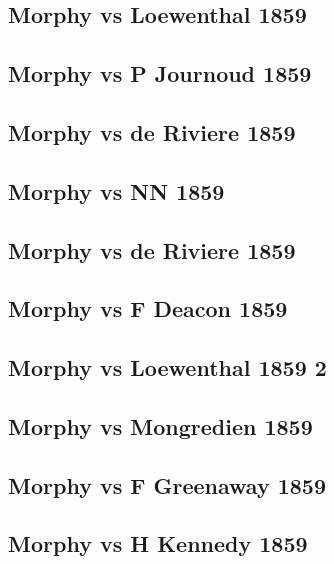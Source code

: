 \documentclass[]{book}
\begin{document}
\subsection{Morphy vs Loewenthal 1859}\label{morphy-vs-loewenthal-1859}

\subsection{Morphy vs P Journoud 1859}\label{morphy-vs-p-journoud-1859}

\subsection{Morphy vs de Riviere 1859}\label{morphy-vs-de-riviere-1859}

\subsection{Morphy vs NN 1859}\label{morphy-vs-nn-1859}

\subsection{Morphy vs de Riviere
1859}\label{morphy-vs-de-riviere-1859-1}

\subsection{Morphy vs F Deacon 1859}\label{morphy-vs-f-deacon-1859}

\subsection{Morphy vs Loewenthal 1859
2}\label{morphy-vs-loewenthal-1859-2}

\subsection{Morphy vs Mongredien 1859}\label{morphy-vs-mongredien-1859}

\subsection{Morphy vs F Greenaway
1859}\label{morphy-vs-f-greenaway-1859}

\subsection{Morphy vs H Kennedy 1859}\label{morphy-vs-h-kennedy-1859}
\end{document}
